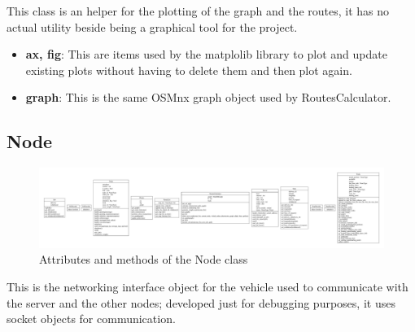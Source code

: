 \documentclass[titlepage]{article}
\begin{document}
This class is an helper for the plotting of the graph and the routes, it has no actual utility beside being a graphical tool for the project.

\begin{itemize}
    \item \textbf{ax, fig}: This are items used by the matplolib library to plot and update existing plots without having to delete them and then plot again.
    \item \textbf{graph}: This is the same OSMnx graph object used by RoutesCalculator.
\end{itemize}

\subsection{Node}
\begin{figure}[H]
    \centering
    \includegraphics[trim={15cm 3cm 72.5cm 3cm}, clip, scale=.5]{img/classes.pdf}
    \caption{Attributes and methods of the Node class}
    \label{fig:node_class}
\end{figure}

This is the networking interface object for the vehicle used to communicate with the server and the other nodes; developed just for debugging purposes, it uses socket objects for communication.
\end{document}
